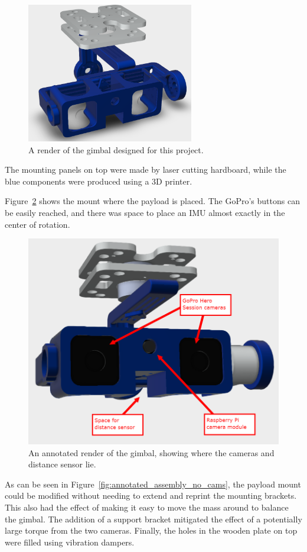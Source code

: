\begin{figure}[h!]
  \centering
  \includegraphics[width=0.65\textwidth]{methodology/assembled_render_no_cameras_motors}
  \caption{\label{fig:assembled_render} A render of the gimbal designed for this project.}
\end{figure}

The mounting panels on top were made by laser cutting hardboard, while the blue components were produced using a 3D printer.

Figure~\ref{fig:annotated_assembly_with_cams} shows the mount where the payload is placed. The GoPro's buttons can be easily reached, and there was space to place an IMU almost exactly in the center of rotation.

\begin{figure}[h!]
    \centering
    \includegraphics[width=0.65\linewidth]{methodology/annotated_assembly_with_cams}
    \caption{\label{fig:annotated_assembly_with_cams}An annotated render of the gimbal, showing where the cameras and distance sensor lie.}
\end{figure}

As can be seen in Figure~\ref{fig:annotated_assembly_no_cams}, the payload mount could be modified without needing to extend and reprint the mounting brackets. This also had the effect of making it easy to move the mass around to balance the gimbal. The addition of a support bracket mitigated the effect of a potentially large torque from the two cameras. Finally, the holes in the wooden plate on top were filled using vibration dampers.

